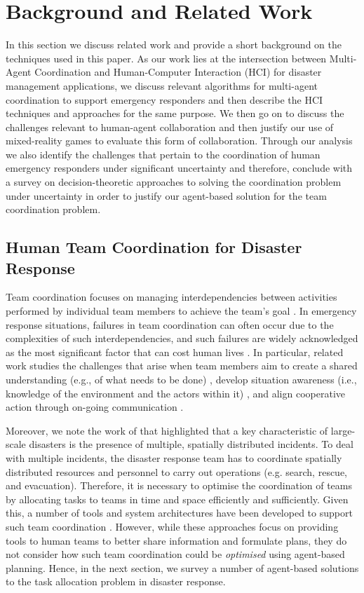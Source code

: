 \section{Background and Related Work}\label{sec:relatedwork}
In this section we discuss related work and provide a short background on the techniques used in this paper.  As our work lies at the intersection between Multi-Agent Coordination and Human-Computer Interaction (HCI) for disaster management applications, we discuss relevant algorithms for multi-agent coordination to support emergency responders and then describe the HCI techniques and approaches for the same purpose. We then go on to discuss the challenges relevant to human-agent collaboration and then justify our use of mixed-reality games to evaluate this form of collaboration.  Through our analysis we also identify the challenges that pertain to the coordination of human emergency responders under significant uncertainty and therefore, conclude with a survey on decision-theoretic approaches to solving the coordination problem under uncertainty in order to justify our agent-based solution for the team coordination problem.
\subsection{Human Team Coordination for Disaster Response}
Team coordination focuses on managing interdependencies between activities performed  by individual team members to achieve the team's goal \cite{Malone1990}. In emergency response situations, failures in team coordination can often occur due to the complexities of such interdependencies, and such failures are widely acknowledged as the most significant factor that can cost human lives \cite[p. 2]{Toups2011}. In particular, related work studies the challenges that arise when team members aim to create a shared understanding (e.g., of what needs to be done) \cite{Convertino2011}, develop situation awareness (i.e., knowledge of the environment and the actors within it) \cite{bader2008digital}, and align cooperative action through on-going communication \cite{Toups2011}.

Moreover, we note the work of \cite{chen2005} that highlighted that a key characteristic of large-scale disasters is the presence of multiple, spatially distributed incidents. To deal with multiple incidents, the disaster response team has to coordinate spatially distributed resources and personnel to carry out operations (e.g. search, rescue, and evacuation). Therefore, it is necessary to optimise the coordination of teams by allocating tasks to teams in time and space efficiently and sufficiently. Given this, a number of tools and system architectures have been developed to support such team coordination \cite{Monares2011} \cite{Padilha2010} \cite{Convertino2011}. However, while these approaches focus on providing tools to human teams to better share  information and formulate plans,  they do not consider how such team coordination could be \emph{optimised} using agent-based planning. Hence, in the next section, we  survey a number of agent-based solutions to the task allocation problem in disaster response.

